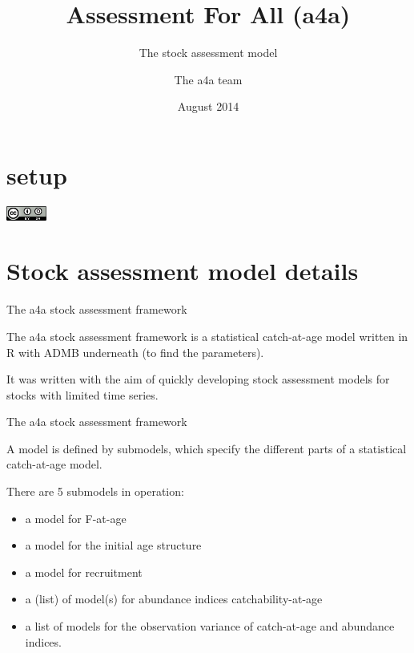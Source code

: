 \documentclass{beamer}\usepackage[]{graphicx}\usepackage[]{color}
\title{Assessment For All (a4a)}
\subtitle{The stock assessment model}
\author{The a4a team}
\institute[JRC]{European Commission\\ Joint Research Centre}
\date{August 2014}
\begin{document}
\section{setup} %




\begin{frame}%
\titlepage
	\begin{flushright}
		\includegraphics[width=0.1\textwidth]{cc.png}
	\end{flushright}
\end{frame}

\section{Stock assessment model details}

\newcommand{\E}[1]{\text{E}\left[#1\right]}
\newcommand{\Var}[1]{\text{Var}\left[#1\right]}

\begin{frame}{The a4a stock assessment framework}

The a4a stock assessment framework is a statistical catch-at-age model written in R with ADMB underneath (to find the parameters).

It was written with the aim of quickly developing stock assessment models for stocks with limited time series. 

\end{frame}

\begin{frame}{The a4a stock assessment framework}

A model is defined by submodels, which specify the different parts of a statistical catch-at-age model.

There are 5 submodels in operation: 
\begin{itemize}
  \item a model for F-at-age
  \item a model for the initial age structure
  \item a model for recruitment
  \item a (list) of model(s) for abundance indices catchability-at-age
  \item a list of models for the observation variance of catch-at-age and abundance indices.
\end{itemize}

\end{frame}
\end{document}
